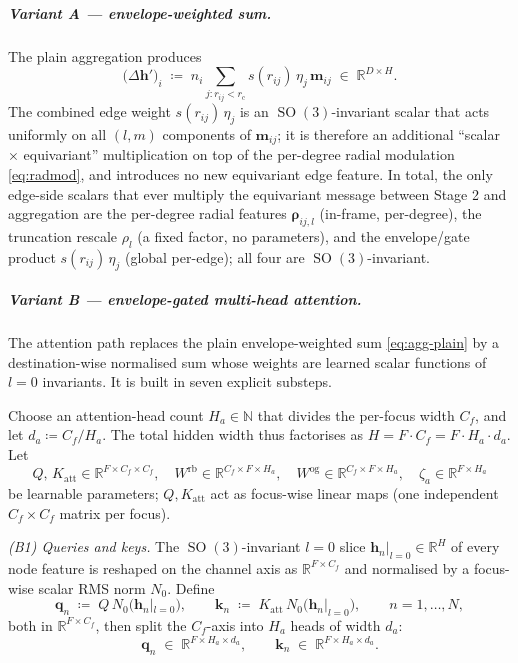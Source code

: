 \documentclass[11pt,a4paper]{article}
\DeclareMathOperator{\SO}{SO}
\newcommand{\R}{\mathbb{R}}
\newcommand{\N}{\mathbb{N}}
\newcommand{\bh}{\bm{h}}
\newcommand{\bq}{\bm{q}}
\newcommand{\bk}{\bm{k}}
\newcommand{\brho}{\bm{\rho}}
\newcommand{\rcut}{r_{\mathrm{c}}}
\theoremstyle{plain}
\theoremstyle{definition}
\theoremstyle{remark}
\begin{document}
    \subparagraph{Variant A --- envelope-weighted sum.}
    The plain aggregation produces
    \begin{equation}\label{eq:agg-plain}
        \bigl(\Delta\bh'\bigr)_i\;\coloneqq\;n_i\!\sum_{j:r_{ij}<\rcut} s(r_{ij})\,\eta_j\,\bm{m}_{ij}\;\in\;\R^{D\times H}.
    \end{equation}
    The combined edge weight $s(r_{ij})\,\eta_j$ is an $\SO(3)$-invariant scalar that acts uniformly on all $(l,m)$ components of $\bm{m}_{ij}$; it is therefore an additional ``scalar $\times$ equivariant'' multiplication on top of the per-degree radial modulation \eqref{eq:radmod}, and introduces no new equivariant edge feature.
    In total, the only edge-side scalars that ever multiply the equivariant message between Stage 2 and aggregation are the per-degree radial features $\brho_{ij,l}$ (in-frame, per-degree), the truncation rescale $\rho_l$ (a fixed factor, no parameters), and the envelope/gate product $s(r_{ij})\,\eta_j$ (global per-edge); all four are $\SO(3)$-invariant.

    \subparagraph{Variant B --- envelope-gated multi-head attention.}
    The attention path replaces the plain envelope-weighted sum
    \eqref{eq:agg-plain} by a destination-wise normalised sum whose weights are
    learned scalar functions of $l=0$ invariants. It is built in seven explicit
    substeps.

    Choose an attention-head count $H_a\in\N$ that divides the per-focus width
$C_f$, and let $d_a\coloneqq C_f/H_a$. The total hidden width thus factorises
    as $H=F\cdot C_f=F\cdot H_a\cdot d_a$. Let
    \[
    Q,\,K_{\mathrm{att}}\in\R^{F\times C_f\times C_f},\quad
    W^{\mathrm{rb}}\in\R^{C_f\times F\times H_a},\quad
    W^{\mathrm{og}}\in\R^{C_f\times F\times H_a},\quad
    \zeta_a\in\R^{F\times H_a}
\]
be learnable parameters; $Q,K_{\mathrm{att}}$ act as focus-wise linear maps
(one independent $C_f\times C_f$ matrix per focus).

\emph{(B1) Queries and keys.}
The $\SO(3)$-invariant $l=0$ slice $\bh_n|_{l=0}\in\R^{H}$ of every node feature is reshaped on the channel axis as $\R^{F\times C_f}$ and normalised by a focus-wise scalar RMS norm $N_0$.
Define
\begin{equation}\label{eq:qk}
    \bq_n \;\coloneqq\; Q\,N_0\bigl(\bh_n|_{l=0}\bigr),\qquad
    \bk_n \;\coloneqq\; K_{\mathrm{att}}\,N_0\bigl(\bh_n|_{l=0}\bigr),\qquad n=1,\dots,N,
\end{equation}
both in $\R^{F\times C_f}$, then split the $C_f$-axis into $H_a$ heads of width $d_a$:
\begin{equation}\label{eq:qk-split}
    \bq_n\;\in\;\R^{F\times H_a\times d_a},\qquad \bk_n\;\in\;\R^{F\times H_a\times d_a}.
\end{equation}
\end{document}
